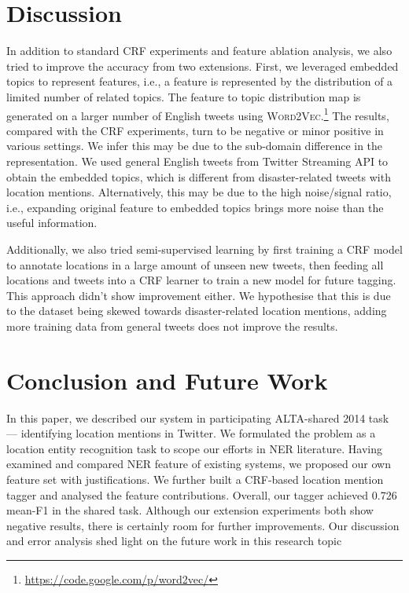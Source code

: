 \documentclass[11pt]{article}
\newcommand{\ie}{i.e.,\xspace}
\newcommand{\wordvec}{\textsc{Word2Vec}\xspace}
\newcommand{\myurl}[1]{{\footnotesize\url{#1}}}
\begin{document}
\section{Discussion}
\label{sec:discussion}

In addition to standard CRF experiments and feature ablation analysis, we also tried to improve the accuracy from two extensions.
First, we leveraged embedded topics to represent features, \ie a feature is represented by the distribution of a limited number of related topics.
The feature to topic distribution map is generated on a larger number of English tweets using \wordvec.\footnote{\myurl{https://code.google.com/p/word2vec/}}
The results, compared with the CRF experiments, turn to be negative or minor positive in various settings.
We infer this may be due to the sub-domain difference in the representation.
We used general English tweets from Twitter Streaming API to obtain the embedded topics, which is different from disaster-related tweets with location mentions.
Alternatively, this may be due to the high noise/signal ratio, \ie expanding original feature to embedded topics brings more noise than the useful information.

Additionally, we also tried semi-supervised learning by first training a CRF model to annotate locations in a large amount of unseen new tweets, then feeding all locations and tweets into a CRF learner to train a new model for future tagging.
This approach didn't show improvement either.
We hypothesise that this is due to the dataset being skewed towards disaster-related location mentions, adding more training data from general tweets does not improve the results.

\section{Conclusion and Future Work}
\label{sec:conclusion}
In this paper, we described our system in participating ALTA-shared 2014 task --- identifying location mentions in Twitter.
We formulated the problem as a location entity recognition task to scope our efforts in NER literature.
Having examined and compared NER feature of existing systems, we proposed our own feature set with justifications.
We further built a CRF-based location mention tagger and analysed the feature contributions.
Overall, our tagger achieved 0.726 mean-F1 in the shared task.
Although our extension experiments both show negative results, there is certainly room for further improvements.
Our discussion and error analysis shed light on the future work in this research topic



\end{document}
